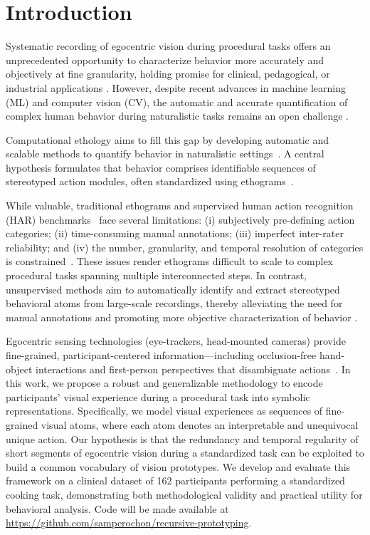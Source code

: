 \documentclass[runningheads]{llncs}
\begin{document}
\section{Introduction}
\label{sec:chapter_5_introduction}

Systematic recording of egocentric vision during procedural tasks offers an unprecedented opportunity to characterize behavior more accurately and objectively at fine granularity, holding promise for clinical, pedagogical, or industrial applications \cite{Bavaresco2022,Datta2019,RAGUSA2023103764}. However, despite recent advances in machine learning (ML) and computer vision (CV), the automatic and accurate quantification of complex human behavior during naturalistic tasks remains an open challenge \cite{Datta2019}.

Computational ethology aims to fill this gap by developing automatic and scalable methods to quantify behavior in naturalistic settings~\cite{Mobbs2021,Anderson2014}. A central hypothesis formulates that behavior comprises identifiable sequences of stereotyped action modules, often standardized using ethograms~\cite{tinbergen1951study}. 

While valuable, traditional ethograms and supervised human action recognition (HAR) benchmarks~\cite{epic,egtea} face several limitations: (i) subjectively pre-defining action categories; (ii) time-consuming manual annotations; (iii) imperfect inter-rater reliability; and (iv) the number, granularity, and temporal resolution of categories is constrained~\cite{sam_icassp,Datta2019}. These issues render ethograms difficult to scale to complex procedural tasks spanning multiple interconnected steps. In contrast, unsupervised methods aim to automatically identify and extract stereotyped behavioral atoms from large-scale recordings, thereby alleviating the need for manual annotations and promoting more objective characterization of behavior \cite{Datta2019}. 

Egocentric sensing technologies (eye-trackers, head-mounted cameras) provide fine-grained, participant-centered information---including occlusion-free hand-object interactions and first-person perspectives that disambiguate actions~\cite{NUNEZMARCOS2022175,7298625}. In this work, we propose a robust and generalizable methodology to encode participants' visual experience during a procedural task into symbolic representations. Specifically, we model visual experiences as sequences of fine-grained visual atoms, where each atom denotes an interpretable and unequivocal unique action. Our hypothesis is that the redundancy and temporal regularity of short segments of egocentric vision during a standardized task can be exploited to build a common vocabulary of vision prototypes. We develop and evaluate this framework on a clinical dataset of 162 participants performing a standardized cooking task, demonstrating both methodological validity and practical utility for behavioral analysis. Code will be made available at \url{https://github.com/samperochon/recursive-prototyping}.
\end{document}
